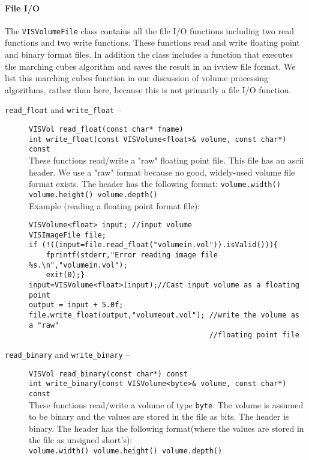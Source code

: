 \paragraph{File I/O}
The {\tt VISVolumeFile} class contains all the file I/O functions
including two read functions and two write functions.
These functions read and write floating point
and binary format files.
In addition the class includes a function that executes the 
marching cubes algorithm and saves the result in an ivview
file format.
We list this marching cubes function in our
discussion of volume processing algorithms, rather than here,
because this is not primarily a file I/O function.
\begin{description}
\item[{\tt read\_float} and {\tt write\_float} --]
{\tt VISVol read\_float(const char* fname)}\\
{\tt int write\_float(const VISVolume<float>\& volume, const char*) const}\\
These functions read/write a "raw" floating point file.  This file
has an ascii header.  We use a "raw" format because no good, widely-used
volume file format exists.  The header has the following format:
{\tt volume.width() volume.height() volume.depth()}\\
Example (reading a floating point format file):\\
\begin{tt}
\begin{verbatim}
VISVolume<float> input; //input volume
VISImageFile file;
if (!((input=file.read_float("volumein.vol")).isValid())){
    fprintf(stderr,"Error reading image file %s.\n","volumein.vol");
    exit(0);}
input=VISVolume<float>(input);//Cast input volume as a floating point
output = input + 5.0f;
file.write_float(output,"volumeout.vol"); //write the volume as a "raw"
                                          //floating point file
\end{verbatim}
\end{tt}
\item[{\tt read\_binary} and {\tt write\_binary} --]
{\tt VISVol read\_binary(const char*) const}\\
{\tt int write\_binary(const VISVolume<byte>\& volume, const char*) const}\\
These functions read/write a volume of type {\tt byte}.
The volume is assumed to be
binary and the values are stored in the file as bits.  The header is binary.
The header has the following format(where the values are stored in the
file as unsigned short's):\\
{\tt volume.width() volume.height() volume.depth()}
\end{description}


